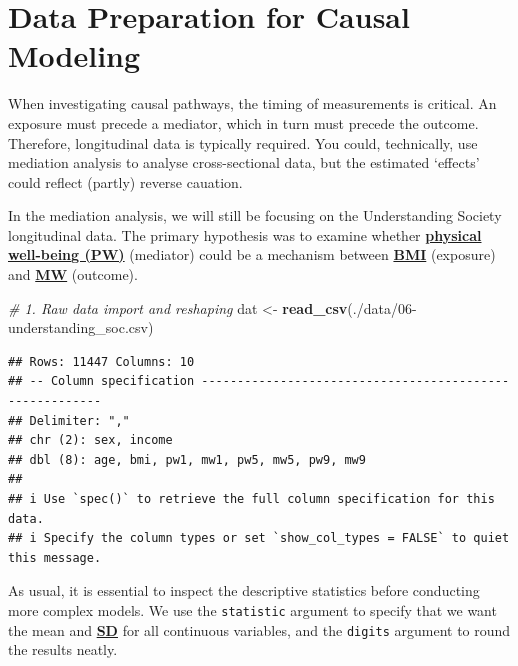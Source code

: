 \documentclass[
]{book}
\newenvironment{Shaded}{\begin{snugshade}}{\end{snugshade}}
\newcommand{\CommentTok}[1]{\textcolor[rgb]{0.56,0.35,0.01}{\textit{#1}}}
\newcommand{\FunctionTok}[1]{\textcolor[rgb]{0.13,0.29,0.53}{\textbf{#1}}}
\newcommand{\NormalTok}[1]{#1}
\newcommand{\OtherTok}[1]{\textcolor[rgb]{0.56,0.35,0.01}{#1}}
\newcommand{\StringTok}[1]{\textcolor[rgb]{0.31,0.60,0.02}{#1}}
\begin{document}
\section{Data Preparation for Causal Modeling}\label{data-preparation-for-causal-modeling}

When investigating causal pathways, the timing of measurements is critical. An exposure must precede a mediator, which in turn must precede the outcome. Therefore, longitudinal data is typically required. You could, technically, use mediation analysis to analyse cross-sectional data, but the estimated `effects' could reflect (partly) reverse cauation.

In the mediation analysis, we will still be focusing on the Understanding Society longitudinal data. The primary hypothesis was to examine whether \textbf{\hyperref[acronyms_PW]{physical well-being (PW)}} (mediator) could be a mechanism between \textbf{\hyperref[acronyms_BMI]{BMI}} (exposure) and \textbf{\hyperref[acronyms_MW]{MW}} (outcome).

\begin{Shaded}
\begin{Highlighting}[]
\CommentTok{\# 1. Raw data import and reshaping}
\NormalTok{dat }\OtherTok{\textless{}{-}} \FunctionTok{read\_csv}\NormalTok{(}\StringTok{\textquotesingle{}./data/06{-}understanding\_soc.csv\textquotesingle{}}\NormalTok{) }
\end{Highlighting}
\end{Shaded}

\begin{verbatim}
## Rows: 11447 Columns: 10
## -- Column specification --------------------------------------------------------
## Delimiter: ","
## chr (2): sex, income
## dbl (8): age, bmi, pw1, mw1, pw5, mw5, pw9, mw9
## 
## i Use `spec()` to retrieve the full column specification for this data.
## i Specify the column types or set `show_col_types = FALSE` to quiet this message.
\end{verbatim}

As usual, it is essential to inspect the descriptive statistics before conducting more complex models. We use the \texttt{statistic} argument to specify that we want the mean and \textbf{\hyperref[acronyms_SD]{SD}} for all continuous variables, and the \texttt{digits} argument to round the results neatly.
\end{document}
